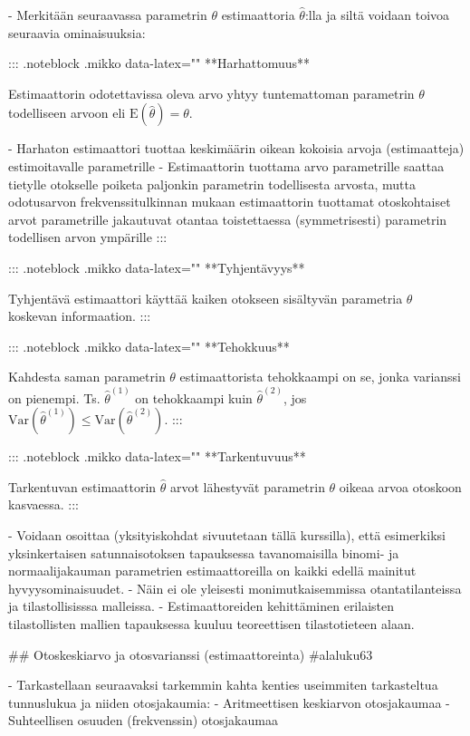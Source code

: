 \documentclass[
]{book}
\begin{document}
\begin{itemize}
- Merkitään seuraavassa parametrin $\theta$ estimaattoria $\widehat{\theta}$:lla ja siltä voidaan toivoa seuraavia ominaisuuksia:

::: {.noteblock .mikko data-latex="{}"}
**Harhattomuus**  

Estimaattorin odotettavissa oleva arvo yhtyy tuntemattoman parametrin $\theta$ todelliseen arvoon eli $\text{E}(\widehat{\theta}) = \theta$.

- Harhaton estimaattori tuottaa keskimäärin oikean kokoisia arvoja (estimaatteja) estimoitavalle parametrille
- Estimaattorin tuottama arvo parametrille saattaa tietylle otokselle poiketa paljonkin parametrin todellisesta arvosta, mutta odotusarvon frekvenssitulkinnan mukaan estimaattorin tuottamat otoskohtaiset arvot parametrille jakautuvat otantaa toistettaessa (symmetrisesti) parametrin todellisen arvon ympärille
:::



::: {.noteblock .mikko data-latex="{}"}
**Tyhjentävyys**  

Tyhjentävä estimaattori käyttää kaiken otokseen sisältyvän parametria $\theta$ koskevan informaation.
:::

::: {.noteblock .mikko data-latex="{}"}
**Tehokkuus**  

Kahdesta saman parametrin $\theta$ estimaattorista tehokkaampi on se, jonka varianssi on pienempi. Ts. $\widehat{\theta}^{(1)}$ on tehokkaampi kuin $\widehat{\theta}^{(2)}$, jos  $\mathrm{Var}(\widehat{\theta}^{(1)}) \le \mathrm{Var}(\widehat{\theta}^{(2)})$.
:::

::: {.noteblock .mikko data-latex="{}"}
**Tarkentuvuus**  

Tarkentuvan estimaattorin $\widehat{\theta}$ arvot lähestyvät parametrin $\theta$ oikeaa arvoa otoskoon kasvaessa.
:::

- Voidaan osoittaa (yksityiskohdat sivuutetaan tällä kurssilla), että esimerkiksi yksinkertaisen satunnaisotoksen tapauksessa tavanomaisilla binomi- ja normaalijakauman parametrien estimaattoreilla on kaikki edellä mainitut hyvyysominaisuudet.
  - Näin ei ole yleisesti monimutkaisemmissa otantatilanteissa ja tilastollisisssa malleissa.
  - Estimaattoreiden kehittäminen erilaisten tilastollisten mallien tapauksessa kuuluu teoreettisen tilastotieteen alaan.

## Otoskeskiarvo ja otosvarianssi (estimaattoreinta) {#alaluku63}

- Tarkastellaan seuraavaksi tarkemmin kahta kenties useimmiten tarkasteltua tunnuslukua ja niiden otosjakaumia: 
  - Aritmeettisen keskiarvon otosjakaumaa
  - Suhteellisen osuuden (frekvenssin) otosjakaumaa


\end{itemize}
\end{document}
